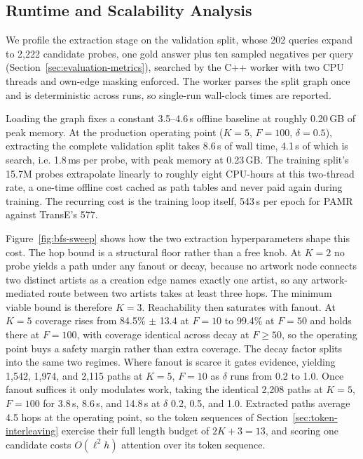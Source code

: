 \documentclass[runningheads]{llncs}
\begin{document}
\subsection{Runtime and Scalability Analysis}
\label{sec:runtime}

We profile the extraction stage on the validation split, whose 202
queries expand to 2,222 candidate probes, one gold answer plus ten
sampled negatives per query (Section~\ref{sec:evaluation-metrics}),
searched by the C++ worker with two CPU threads and own-edge masking
enforced. The worker parses the split graph once and is deterministic
across runs, so single-run wall-clock times are reported.

Loading the graph fixes a constant 3.5--4.6\,s offline baseline at
roughly 0.20\,GB of peak memory. At the production
operating point ($K = 5$, $F = 100$, $\delta = 0.5$), extracting the
complete validation split takes 8.6\,s of wall time, 4.1\,s of which is
search, i.e. 1.8\,ms per probe, with peak memory at 0.23\,GB. The
training split's 15.7M probes extrapolate linearly to roughly eight
CPU-hours at this two-thread rate, a one-time offline cost cached as
path tables and never paid again during training. The recurring cost is
the training loop itself, 543\,s per epoch for PAMR against TransE's
577.

Figure~\ref{fig:bfs-sweep} shows how the two extraction hyperparameters
shape this cost. The hop bound is a structural floor rather than a
free knob. At $K = 2$ no probe yields a path under any fanout or decay, because no
artwork node connects two distinct artists as a creation edge names
exactly one artist, so any artwork-mediated route between two artists
takes at least three hops. The minimum viable bound
is therefore $K = 3$. Reachability then saturates with fanout. At
$K = 5$ coverage rises from 84.5\% $\pm$ 13.4 at $F = 10$ to 99.4\% at
$F = 50$ and holds there at $F = 100$, with coverage identical across
decay at $F \geq 50$, so the operating point buys a
safety margin rather than extra coverage. The decay factor splits into
the same two regimes. Where fanout is scarce it gates evidence,
yielding 1{,}542, 1{,}974, and 2{,}115 paths at $K = 5$, $F = 10$ as
$\delta$ runs from 0.2 to 1.0. Once fanout suffices it only modulates
work, taking the identical 2{,}208 paths at $K = 5$, $F = 100$ for
3.8\,s, 8.6\,s, and 14.8\,s at $\delta$ 0.2, 0.5, and 1.0. Extracted
paths average 4.5 hops at the operating point, so the token sequences
of Section~\ref{sec:token-interleaving} exercise their full length
budget of $2K + 3 = 13$, and scoring one candidate costs $O(\ell^{2}h)$
attention over its token sequence.
\end{document}
